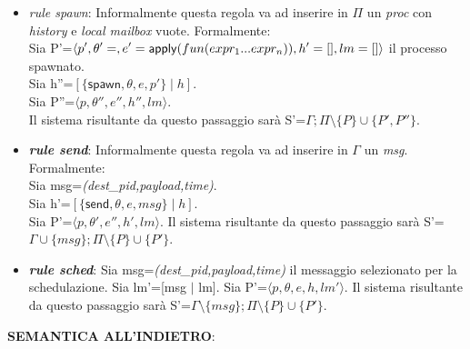 \documentclass[background.tex]{subfiles}
\begin{document}
\begin{itemize}
	\item \textit{rule spawn}: Informalmente questa regola va ad inserire in $\Pi$ un \textit{proc} con \textit{history} e \textit{local mailbox} vuote. Formalmente:\\
	Sia P'=$\displaystyle \langle p',\theta'=\empty,e'=\mathsf{apply}(fun(expr_{1}...expr_{n})),h'=[],lm=[]\rangle$ il processo spawnato.\\
	Sia h''=$\displaystyle [\{\mathsf{spawn},\theta,e,p'\} \mid h]$.\\
	Sia P''=$\displaystyle \langle p,\theta'',e'',h'',lm\rangle$.\\
	Il sistema risultante da questo passaggio sarà S'=$\displaystyle \Gamma;\Pi\setminus\{P\}\cup\{P',P''\}$.
	\item \textit{\textbf{rule send}}: Informalmente questa regola va ad inserire in $\Gamma$ un \textit{msg}. Formalmente:\\
	Sia msg=\textit{(dest\_pid,payload,time)}.\\
	Sia h'=$\displaystyle [\{\mathsf{send},\theta,e,msg\} \mid h]$.\\
	Sia P'=$\displaystyle \langle p,\theta',e'',h',lm \rangle$.
	Il sistema risultante da questo passaggio sarà S'=$\displaystyle \Gamma\cup\{msg\};\Pi\setminus\{P\}\cup\{P'\}$.
	\item \textit{\textbf{rule sched}}: 
	Sia msg=\textit{(dest\_pid,payload,time)} il messaggio selezionato per la schedulazione.
	Sia lm'=[msg $\mid$ lm].
	Sia P'=$\displaystyle \langle p,\theta,e,h,lm'\rangle$.
	Il sistema risultante da questo passaggio sarà S'=$\displaystyle \Gamma\setminus\{msg\};\Pi\setminus\{P\}\cup\{P'\}$.
\end{itemize}
\textbf{SEMANTICA ALL'INDIETRO}:
\end{document}
